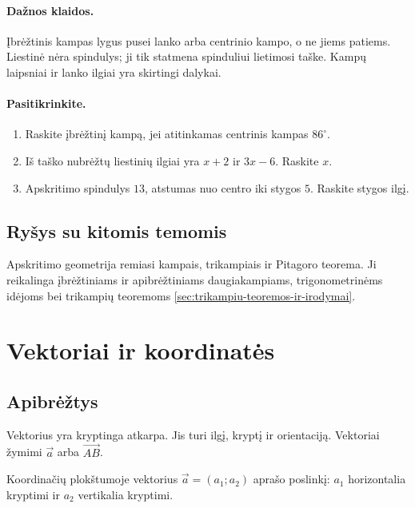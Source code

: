 \paragraph{Dažnos klaidos.}
Įbrėžtinis kampas lygus pusei lanko arba centrinio kampo, o ne jiems patiems. Liestinė nėra spindulys; ji tik statmena spinduliui lietimosi taške. Kampų laipsniai ir lanko ilgiai yra skirtingi dalykai.

\paragraph{Pasitikrinkite.}
\begin{enumerate}
\item Raskite įbrėžtinį kampą, jei atitinkamas centrinis kampas $86^\circ$.
\item Iš taško nubrėžtų liestinių ilgiai yra $x+2$ ir $3x-6$. Raskite $x$.
\item Apskritimo spindulys $13$, atstumas nuo centro iki stygos $5$. Raskite stygos ilgį.
\end{enumerate}

\subsection{Ryšys su kitomis temomis}

Apskritimo geometrija remiasi kampais, trikampiais ir Pitagoro teorema. Ji reikalinga įbrėžtiniams ir apibrėžtiniams daugiakampiams, trigonometrinėms idėjoms bei trikampių teoremoms \ref{sec:trikampiu-teoremos-ir-irodymai}.

\section{Vektoriai ir koordinatės}\label{sec:vektoriai-ir-koordinates}

\subsection{Apibrėžtys}

\begin{apibreztis}
Vektorius yra kryptinga atkarpa. Jis turi ilgį, kryptį ir orientaciją. Vektoriai žymimi $\vec a$ arba $\overrightarrow{AB}$.
\end{apibreztis}

\begin{apibreztis}
Koordinačių plokštumoje vektorius $\vec a=(a_1;a_2)$ aprašo poslinkį: $a_1$ horizontalia kryptimi ir $a_2$ vertikalia kryptimi.
\end{apibreztis}

